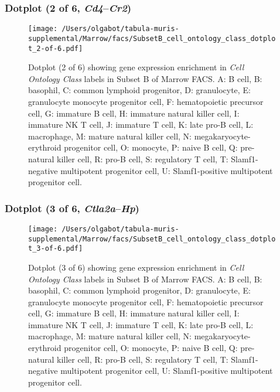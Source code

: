 \subsubsection{Dotplot (2 of 6, \emph{Cd4}--\emph{Cr2})}
\begin{figure}[h]
\centering
\texttt{[image: /Users/olgabot/tabula-muris-supplemental/Marrow/facs/SubsetB\_cell\_ontology\_class\_dotplot\_2-of-6.pdf]}

\caption{ Dotplot (2 of 6)  showing gene expression enrichment in \emph{Cell Ontology Class} labels in Subset B of Marrow FACS. A: B cell, B: basophil, C: common lymphoid progenitor, D: granulocyte, E: granulocyte monocyte progenitor cell, F: hematopoietic precursor cell, G: immature B cell, H: immature natural killer cell, I: immature NK T cell, J: immature T cell, K: late pro-B cell, L: macrophage, M: mature natural killer cell, N: megakaryocyte-erythroid progenitor cell, O: monocyte, P: naive B cell, Q: pre-natural killer cell, R: pro-B cell, S: regulatory T cell, T: Slamf1-negative multipotent progenitor cell, U: Slamf1-positive multipotent progenitor cell.}
\end{figure}


\clearpage

\subsubsection{Dotplot (3 of 6, \emph{Ctla2a}--\emph{Hp})}
\begin{figure}[h]
\centering
\texttt{[image: /Users/olgabot/tabula-muris-supplemental/Marrow/facs/SubsetB\_cell\_ontology\_class\_dotplot\_3-of-6.pdf]}

\caption{ Dotplot (3 of 6)  showing gene expression enrichment in \emph{Cell Ontology Class} labels in Subset B of Marrow FACS. A: B cell, B: basophil, C: common lymphoid progenitor, D: granulocyte, E: granulocyte monocyte progenitor cell, F: hematopoietic precursor cell, G: immature B cell, H: immature natural killer cell, I: immature NK T cell, J: immature T cell, K: late pro-B cell, L: macrophage, M: mature natural killer cell, N: megakaryocyte-erythroid progenitor cell, O: monocyte, P: naive B cell, Q: pre-natural killer cell, R: pro-B cell, S: regulatory T cell, T: Slamf1-negative multipotent progenitor cell, U: Slamf1-positive multipotent progenitor cell.}
\end{figure}


\clearpage

